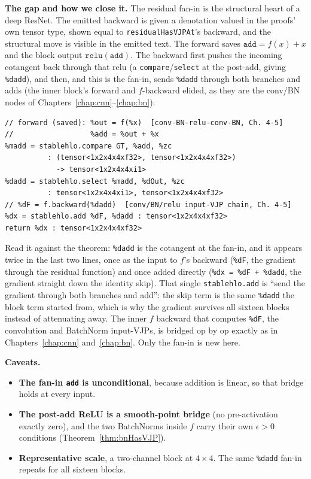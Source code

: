 \medskip\noindent\textbf{The gap and how we close it.} The residual
fan-in is the structural heart of a deep ResNet. The emitted backward is
given a denotation valued in the proofs' own tensor type, shown equal to
\texttt{residualHasVJPAt}'s backward, and the structural move is
visible in the emitted text. The forward
saves $\texttt{add} = f(x) + x$ and the block output
$\texttt{relu}(\texttt{add})$. The backward first pushes the incoming
cotangent back through that relu (a \texttt{compare}/\texttt{select} at the
post-add, giving \texttt{\%dadd}), and then, and this is the fan-in, sends
\texttt{\%dadd} through both branches and adds (the inner block's
forward and $f$-backward elided, as they are the conv/BN nodes of
Chapters~\ref{chap:cnn}--\ref{chap:bn}):

\begin{verbatim}
// forward (saved): %out = f(%x)  [conv-BN-relu-conv-BN, Ch. 4-5]
//                  %add = %out + %x
%madd = stablehlo.compare GT, %add, %zc
          : (tensor<1x2x4x4xf32>, tensor<1x2x4x4xf32>)
            -> tensor<1x2x4x4xi1>
%dadd = stablehlo.select %madd, %dOut, %zc
          : tensor<1x2x4x4xi1>, tensor<1x2x4x4xf32>
// %dF = f.backward(%dadd)  [conv/BN/relu input-VJP chain, Ch. 4-5]
%dx = stablehlo.add %dF, %dadd : tensor<1x2x4x4xf32>
return %dx : tensor<1x2x4x4xf32>
\end{verbatim}

\noindent Read it against the theorem: \texttt{\%dadd} is the cotangent at
the fan-in, and it appears twice in the last two lines, once as
the input to $f$'s backward (\texttt{\%dF}, the gradient through the
residual function) and once added directly (\texttt{\%dx = \%dF + \%dadd},
the gradient straight down the identity skip). That single
\texttt{stablehlo.add} is ``send the gradient through both branches
and add'': the skip term is the same \texttt{\%dadd} the block term started
from, which is why the gradient survives all sixteen blocks instead of
attenuating away. The inner $f$ backward that computes \texttt{\%dF}, the
convolution and BatchNorm input-VJPs, is bridged op by op exactly as in
Chapters~\ref{chap:cnn} and~\ref{chap:bn}. Only the fan-in is new here.

\medskip\noindent\textbf{Caveats.}
\begin{itemize}
  \item \textbf{The fan-in \texttt{add} is unconditional}, because addition is
    linear, so that bridge holds at every input.
  \item \textbf{The post-add ReLU is a smooth-point bridge} (no
    pre-activation exactly zero), and the two BatchNorms inside $f$ carry their own $\epsilon > 0$ conditions (Theorem~\ref{thm:bnHasVJP}).
  \item \textbf{Representative scale}, a two-channel block at $4\times4$. The
    same \texttt{\%dadd} fan-in repeats for all sixteen blocks.
\end{itemize}

